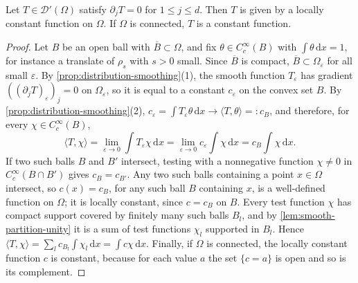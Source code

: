 \begin{corollary}\label{cor:zero-gradient-constant}
Let $T\in\mathcal D'(\Omega)$ satisfy $\partial_jT=0$ for $1\leq j\leq d$. Then $T$ is given by a locally constant function on $\Omega$. If $\Omega$ is connected, $T$ is a constant function.
\end{corollary}
\begin{proof}
Let $B$ be an open ball with $\overline B\subset\Omega$, and fix $\theta\in C_c^\infty(B)$ with $\int\theta\,\mathrm dx=1$, for instance a translate of $\rho_s$ with $s>0$ small. Since $\overline B$ is compact, $\overline B\subset\Omega_\varepsilon$ for all small $\varepsilon$. By \cref{prop:distribution-smoothing}(1), the smooth function $T_\varepsilon$ has gradient $((\partial_jT)_\varepsilon)_j=0$ on $\Omega_\varepsilon$, so it is equal to a constant $c_\varepsilon$ on the convex set $B$. By \cref{prop:distribution-smoothing}(2), $c_\varepsilon=\int T_\varepsilon\theta\,\mathrm dx\to\langle T,\theta\rangle=:c_B$, and therefore, for every $\chi\in C_c^\infty(B)$,
\[
 \langle T,\chi\rangle=\lim_{\varepsilon\to0}\int T_\varepsilon\chi\,\mathrm dx=\lim_{\varepsilon\to0}c_\varepsilon\int\chi\,\mathrm dx=c_B\int\chi\,\mathrm dx.
\]
If two such balls $B$ and $B'$ intersect, testing with a nonnegative function $\chi\neq0$ in $C_c^\infty(B\cap B')$ gives $c_B=c_{B'}$. Any two such balls containing a point $x\in\Omega$ intersect, so $c(x)=c_B$, for any such ball $B$ containing $x$, is a well-defined function on $\Omega$; it is locally constant, since $c=c_B$ on $B$. Every test function $\chi$ has compact support covered by finitely many such balls $B_l$, and by \cref{lem:smooth-partition-unity} it is a sum of test functions $\chi_l$ supported in $B_l$. Hence $\langle T,\chi\rangle=\sum_lc_{B_l}\int\chi_l\,\mathrm dx=\int c\chi\,\mathrm dx$. Finally, if $\Omega$ is connected, the locally constant function $c$ is constant, because for each value $a$ the set $\{c=a\}$ is open and so is its complement.
\end{proof}

